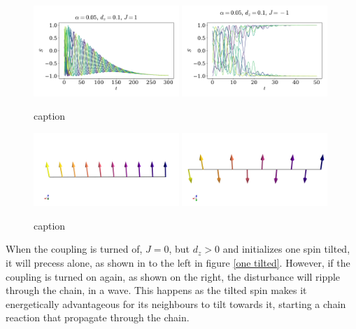 \documentclass{article}
\begin{document}
    \begin{figure}
        \centering
        \includegraphics[width=0.49\textwidth]{../plots/ground_state_f.pdf}
        \includegraphics[width=0.49\textwidth]{../plots/ground_state_af.pdf}
        \caption{caption}
        \label{ground states}
    \end{figure}
    \begin{figure}
        \centering
        \includegraphics[width=0.49\textwidth]{../plots/ground_state_f3D.png}
        \includegraphics[width=0.49\textwidth]{../plots/ground_state_af3D.png}
        \caption{caption}
        \label{ground states 3D}
    \end{figure}

    When the coupling is turned of, $J = 0$, but $d_z>0$ and initializes one spin tilted, it will precess alone, as shown in to the left in figure \ref{one tilted}. However, if the coupling is turned on again, as shown on the right, the disturbance will ripple through the chain, in a wave. This happens as the tilted spin makes it energetically advantageous for its neighbours to tilt towards it, starting a chain reaction that propagate through the chain. 
\end{document}
